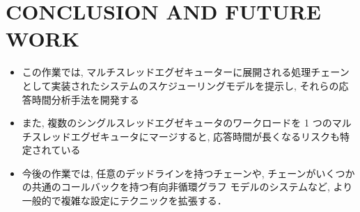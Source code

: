 
\section{CONCLUSION AND FUTURE WORK}
\label{sec: conclusion and future work}

\begin{frame}{}
    \begin{itemize}
        \item この作業では, マルチスレッドエグゼキューターに展開される処理チェーンとして実装されたシステムのスケジューリングモデルを提示し, それらの応答時間分析手法を開発する
\item また, 複数のシングルスレッドエグゼキュータのワークロードを 1 つのマルチスレッドエグゼキュータにマージすると, 応答時間が長くなるリスクも特定されている
\item 今後の作業では, 任意のデッドラインを持つチェーンや, チェーンがいくつかの共通のコールバックを持つ有向非循環グラフ モデルのシステムなど, より一般的で複雑な設定にテクニックを拡張する．
    \end{itemize}
\end{frame}
